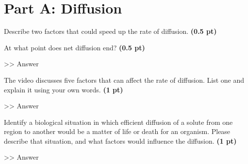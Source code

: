 \documentclass[12pt,a4paper]{article}
\begin{document}
\section*{Part A: Diffusion}
\begin{enumerate}[font=\bfseries, wide]
    {\color{under}\item Describe two factors that could speed up the rate of diffusion. \textbf{(0.5 pt)}}

    {\color{under}\item At what point does net diffusion end? \textbf{(0.5 pt)}}

    >> Answer

    {\color{under}\item  The video discusses five factors that can affect the rate of diffusion. List one and explain it using your own words. \textbf{(1 pt)}}

    >> Answer
    
    {\color{under}\item Identify a biological situation in which efficient diffusion of a solute from one region to another would be a matter of life or death for an organism. Please describe that situation, and what factors would influence the diffusion. \textbf{(1 pt)}}

    >> Answer

\end{enumerate}
\end{document}
